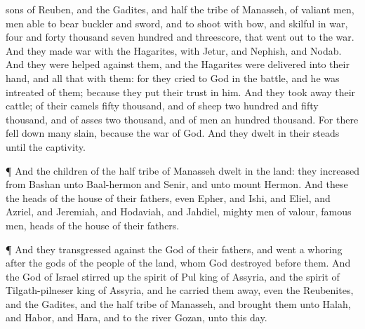 {sons of
Reuben, and the
Gadites, and
half the
tribe of
Manasseh, of valiant
men,
men able to
bear
buckler and
sword, and to
shoot with
bow, and
skilful in
war,
{}
four and
forty
thousand
seven
hundred and
threescore, that went
out to the
war.
And they
made
war with the
Hagarites, with
Jetur, and
Nephish, and
Nodab.
And they were
helped against them, and the
Hagarites were
delivered into their
hand, and all that
{} with them: for they
cried to
God in the
battle, and he was
intreated of them; because they put their
trust in him.
And they took
away their
cattle; of their
camels
fifty
thousand, and of
sheep two
hundred and
fifty
thousand, and of
asses two
thousand, and of
men an
hundred
thousand.
For there
fell down
many
slain, because the
war
{} of
God. And they
dwelt in their steads until the
captivity.
\par }{\PP {}¶ And the
children of the
half
tribe of
Manasseh
dwelt in the
land: they
increased from
Bashan unto
Baal-hermon and
Senir, and unto
mount
Hermon.
And these
{} the
heads of the
house of their
fathers, even
Epher, and
Ishi, and
Eliel, and
Azriel, and
Jeremiah, and
Hodaviah, and
Jahdiel,
mighty
men of
valour,
famous
men,
{}
heads of the
house of their
fathers.
\par }{\PP {}¶ And they
transgressed against the
God of their
fathers, and went a
whoring
after the
gods of the
people of the
land, whom
God
destroyed
before them.
And the
God of
Israel stirred
up the
spirit of
Pul
king of
Assyria, and the
spirit of
Tilgath-pilneser
king of
Assyria, and he carried them
away, even the
Reubenites, and the
Gadites, and the
half
tribe of
Manasseh, and
brought them unto
Halah, and
Habor, and
Hara, and to the
river
Gozan, unto this
day.

}
